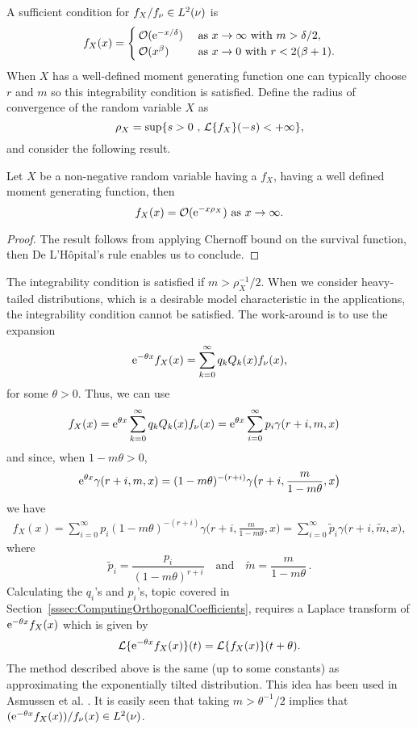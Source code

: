 A sufficient condition for $f_{X}/f_{\nu}\in L^2(\nu)$ is
\begin{equation*}\label{eq:IntegrabilityCondition}
f_{X}(x)=
\begin{cases}
{\mathcal{O}}(\mathrm{e}^{- x/\delta})&\text{ as }x\rightarrow\infty\text{ with }m>\delta/2,\\
{\mathcal{O}}(x^{\beta})&\text{  as }x\rightarrow0\text{ with } r < 2( \beta + 1).
\end{cases}
\end{equation*}
When $X$ has a well-defined moment generating function one can typically choose $r$ and $m$ so this integrability condition is satisfied. Define the radius of convergence of the random variable $X$ as
$$
\rho_X=\sup\{s>0\text{ , }\mathcal{L}\{f_{X}\}(-s)<+\infty\},
$$
and consider the following result.
\begin{proposition}\label{prop:ExpBound}
Let $X$ be a non-negative random variable having a \pdf $f_X$, having a well defined moment generating function, then
$$
f_X(x)={\mathcal{O}}(\mathrm{e}^{- x\rho_X})\text{ as }x\rightarrow\infty.
$$
\end{proposition}
\begin{proof}
The result follows from applying Chernoff bound on the survival function, then De L'H\^opital's rule enables us to conclude.
\end{proof}
The integrability condition is satisfied if $m>\rho_X^{-1}/2$. When we consider heavy-tailed distributions, which is a desirable model characteristic in the applications, the integrability condition cannot be satisfied. The work-around is to use the expansion
\[ \mathrm{e}^{-\theta x} f_{X}(x)
= \sum_{k=0}^\infty q_k Q_k(x) f_\nu(x),  \]
for some $\theta > 0$. Thus, we can use
\begin{align*}
f_{X}(x)
&= \mathrm{e}^{\theta x} \sum_{k=0}^\infty q_k Q_k(x) f_\nu(x)
=  \mathrm{e}^{\theta x} \sum_{i=0}^{\infty} p_i \gamma(r+i,m,x)
\end{align*}
and since, when $1-m \theta > 0$,
\[ \mathrm{e}^{\theta x} \gamma(r+i, m, x) = (1-m \theta)^{-(r+i)} \gamma\big(r+i, \frac{m}{1-m\theta}, x \big)  \]
we have
\begin{align*}
f_{X}(x)
= \sum_{i=0}^{\infty} p_i (1-m \theta)^{-(r+i)} \gamma\big(r+i, \frac{m}{1-m\theta}, x \big)
= \sum_{i=0}^{\infty} \widetilde{p}_i \gamma\big(r+i, \widetilde{m}, x \big),
\end{align*}
where
\[ \widetilde{p}_i = \frac{ p_i }{(1-m \theta)^{r+i}}
\quad\text{and}\quad
\widetilde{m} = \frac{m}{1-m\theta} \,.
\]
Calculating the $q_i$'s and $p_i$'s, topic covered in Section~\ref{sssec:ComputingOrthogonalCoefficients}, requires a Laplace transform of $\mathrm{e}^{-\theta x} f_{X}(x)$ which is given by
\begin{align*}
\mathcal{L}\{ \mathrm{e}^{-\theta x} f_{X}(x) \}(t)
= \mathcal{L}\{ f_{X}(x) \}(t+\theta).
\end{align*}
The method described above is the same (up to some constants) as approximating the exponentially tilted distribution.
This idea has been used in Asmussen et al. \cite{AsGoLa16}.
It is easily seen that taking $m >\theta^{-1}/2$ implies that $(\mathrm{e}^{-\theta x} f_{X}(x))/f_{\nu}(x)\in L^2(\nu)$.

